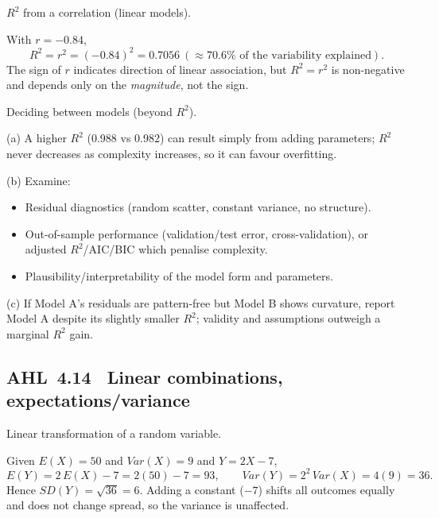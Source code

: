 \documentclass[11pt]{article}
\def\textbf#1{#1}%
\def\mathbb#1{#1}%
\def\mathrm#1{#1}%
\newcommand{\tocsubsection}[1]{\subsection{#1}}
\begin{document}
\begin{solution}
\textbf{$R^2$ from a correlation (linear models).}

With $r=-0.84$,
\[
R^2=r^2=(-0.84)^2=\boxed{0.7056}\ (\approx 70.6\% \text{ of the variability explained}).
\]
The sign of $r$ indicates direction of linear association, but $R^2=r^2$ is non-negative and depends only on the \emph{magnitude}, not the sign.
\end{solution}

\begin{solution}
\textbf{Deciding between models (beyond $R^2$).}

(a) A higher $R^2$ (0.988 vs 0.982) can result simply from adding parameters; $R^2$ never decreases as complexity increases, so it can favour overfitting.

(b) Examine:
\begin{itemize}
  \item Residual diagnostics (random scatter, constant variance, no structure).
  \item Out-of-sample performance (validation/test error, cross-validation), or adjusted $R^2$/AIC/BIC which penalise complexity.
  \item Plausibility/interpretability of the model form and parameters.
\end{itemize}

(c) If Model A’s residuals are pattern-free but Model B shows curvature, report \textbf{Model A} despite its slightly smaller $R^2$; validity and assumptions outweigh a marginal $R^2$ gain.
\end{solution}


\tocsubsection{AHL 4.14 \; Linear combinations, expectations/variance}


\begin{solution}
\textbf{Linear transformation of a random variable.}

Given $\mathbb E(X)=50$ and $\mathrm{Var}(X)=9$ and $Y=2X-7$,
\[
\mathbb E(Y)=2\,\mathbb E(X)-7=2(50)-7=\boxed{93},\qquad
\mathrm{Var}(Y)=2^2\,\mathrm{Var}(X)=4(9)=\boxed{36}.
\]
Hence $\mathrm{SD}(Y)=\sqrt{36}=\boxed{6}$. Adding a constant ($-7$) shifts all outcomes equally and does not change spread, so the variance is unaffected.
\end{solution}
\end{document}
